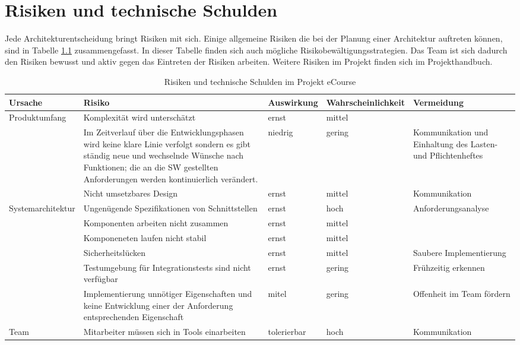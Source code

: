 \chapter{Risiken und technische Schulden}
Jede Architekturentscheidung bringt Risiken mit sich. Einige allgemeine Risiken die bei der Planung einer Architektur auftreten können, sind in Tabelle \ref{tab:Risiken} zusammengefasst. In dieser Tabelle finden sich auch mögliche Risikobewältigungsstrategien. Das Team ist sich dadurch den Risiken bewusst und aktiv gegen das Eintreten der Risiken arbeiten. Weitere Risiken im Projekt finden sich im Projekthandbuch.

\begin{table}
    \centering
    \tiny
    \begin{tabularx}{\textwidth}[H]{|l|X|l|l|X|} 
        \hline 
        Ursache & Risiko & Auswirkung & Wahrscheinlichkeit & Vermeidung \\ 
        \hline
        Produktumfang & Komplexität wird unterschätzt & ernst & mittel &  \\ 
        \hline
            & Im Zeitverlauf über die Entwicklungsphasen wird keine klare Linie verfolgt sondern es gibt ständig neue und wechselnde Wünsche nach Funktionen; die an die SW gestellten Anforderungen werden kontinuierlich verändert. & niedrig &
            gering & Kommunikation und Einhaltung des Lasten- und Pflichtenheftes \\ 
        \hline
            & Nicht umsetzbares Design & ernst & mittel & Kommunikation  \\ 
        \hline
        Systemarchitektur & Ungenügende Spezifikationen von Schnittstellen & ernst & hoch & Anforderungsanalyse \\ 
        \hline
            & Komponenten arbeiten nicht zusammen & ernst & mittel &  \\ 
        \hline
            & Komponeneten laufen nicht stabil & ernst & mittel &  \\ 
        \hline
            & Sicherheitslücken & ernst & mittel & Saubere Implementierung \\ 
        \hline
            & Testumgebung für Integrationstests sind nicht verfügbar & ernst & gering & Frühzeitig erkennen \\ 
        \hline
            & Implementierung unnötiger Eigenschaften und keine Entwicklung einer der Anforderung entsprechenden Eigenschaft & mitel & gering & Offenheit im Team fördern \\ 
        \hline
        Team & Mitarbeiter müssen sich in Tools einarbeiten & tolerierbar & hoch & Kommunikation  \\ 
        \hline
    \end{tabularx}
    \caption{Risiken und technische Schulden im Projekt eCourse}
    \label{tab:Risiken}
\end{table}